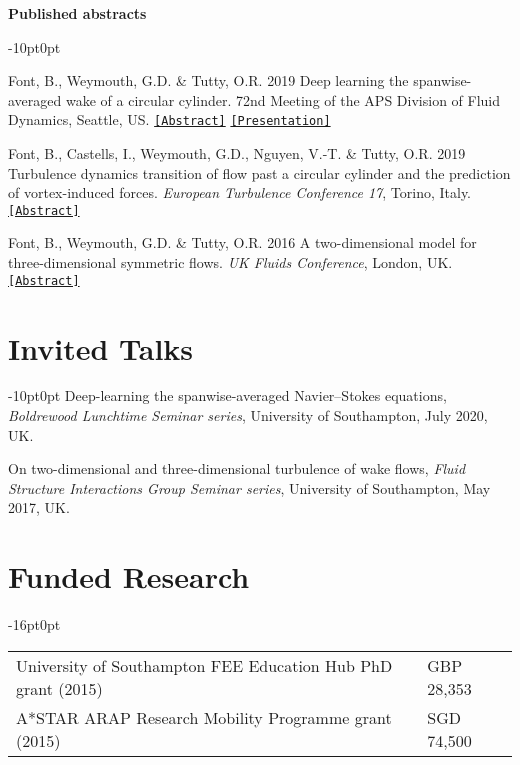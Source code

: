 \documentclass[line]{res}
\newenvironment{p}
  {\begin{adjustwidth}{-10pt}{0pt}}
  {\end{adjustwidth}}
\newenvironment{p3}
  {\begin{adjustwidth}{-16pt}{0pt}
  \vspace{3pt}}
  {\end{adjustwidth}}
\begin{document}
\begin{resume}
\hspace{-1cm}\textbf{Published abstracts}\vspace{0.25cm}
\begin{p}
\begin{etaremune}[leftmargin=-2pt,parsep=5pt]
\item Font, B., Weymouth, G.D.  \&  Tutty, O.R. 2019  Deep learning the spanwise-averaged wake of a circular cylinder. 72nd Meeting of the APS Division of Fluid Dynamics, Seattle, US. \href{https://meetings.aps.org/Meeting/DFD19/Session/L17.5}{\texttt{[Abstract]}} \href{https://github.com/b-fg/APS2019}{\texttt{[Presentation]}}
\item Font, B., Castells, I., Weymouth, G.D., Nguyen, V.-T.  \&  Tutty, O.R. 2019  Turbulence dynamics transition of flow past a circular cylinder and the prediction of vortex-induced forces. \textit{European Turbulence Conference 17}, Torino, Italy. \href{https://etc17.fyper.com/program/show_slot/41}{\texttt{[Abstract]}}
\item Font, B., Weymouth, G.D.  \&  Tutty, O.R. 2016  A two-dimensional model for three-dimensional symmetric flows. \textit{UK Fluids Conference}, London, UK. \href{https://www.imperial.ac.uk/media/imperial-college/faculty-of-engineering/aeronautics/UK-Fluids-Conference-2016-booklet.pdf}{\texttt{[Abstract]}}
\end{etaremune}
\end{p}

\section{Invited Talks}\vspace{0.5cm}
\begin{p}
Deep-learning the spanwise-averaged Navier--Stokes equations, \textit{Boldrewood Lunchtime Seminar series}, University of Southampton, July 2020, UK.\newline

On two-dimensional and three-dimensional turbulence of wake flows, \textit{Fluid Structure Interactions Group Seminar series}, University of Southampton, May 2017, UK.
\end{p}

\section{Funded Research}\vspace{0.5cm}
\begin{p3}
\begin{tabular}{p{} >{\raggedleft\arraybackslash}p{}}
University of Southampton FEE Education Hub PhD grant (2015) & GBP 28,353\\
A*STAR ARAP Research Mobility Programme grant (2015) & SGD 74,500
\end{tabular}
\end{p3}


\end{resume}
\end{document}
